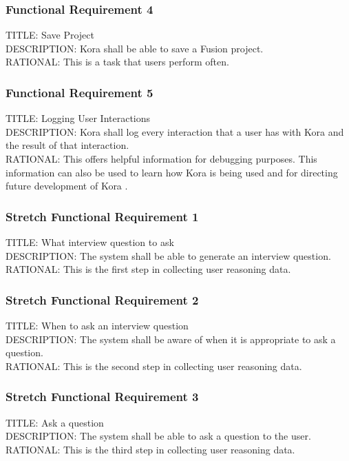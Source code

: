 \documentclass[onecolumn, draftclsnofoot,10pt, compsoc]{IEEEtran}
\def \botname{Kora }
\begin{document}
        \subsubsection{Functional Requirement 4}
        TITLE: Save Project \\
        DESCRIPTION: \botname shall be able to save a Fusion project. \\
        RATIONAL: This is a task that users perform often.
        
        \subsubsection{Functional Requirement 5}
        TITLE: Logging User Interactions \\
        DESCRIPTION: \botname shall log every interaction that a user has with \botname and the result of that interaction. \\
        RATIONAL: This offers helpful information for debugging purposes. This information can also be used to learn how \botname is being used and for directing future development of \botname.
        
        
        \subsubsection{Stretch Functional Requirement 1}
        TITLE: What interview question to ask \\
        DESCRIPTION: The system shall be able to generate an interview question. \\
        RATIONAL: This is the first step in collecting user reasoning data.  
        
        \subsubsection{Stretch Functional Requirement 2}
        TITLE: When to ask an interview question \\
        DESCRIPTION: The system shall be aware of when it is appropriate to ask a question. \\
        RATIONAL: This is the second step in collecting user reasoning data. 
        
        \subsubsection{Stretch Functional Requirement 3}
        TITLE: Ask a question \\
        DESCRIPTION: The system shall be able to ask a question to the user. \\
        RATIONAL: This is the third step in collecting user reasoning data. 
        
\end{document}
